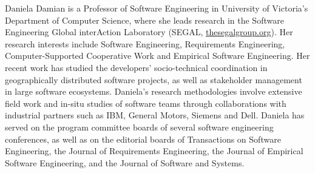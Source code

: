 \documentclass[10pt,journal,compsoc,letterpaper]{IEEEtran}
\begin{document}
\begin{IEEEbiography}{Daniela Damian}
is a Professor of Software Engineering in University of Victoria’s Department of Computer Science, where she leads research in the Software Engineering Global interAction Laboratory (SEGAL, \url{thesegalgroup.org}).
Her research interests include Software Engineering, Requirements Engineering, Computer-Supported Cooperative Work and Empirical Software Engineering. Her recent work has studied the developers’ socio-technical coordination in geographically distributed software projects, as well as stakeholder management in large software ecosystems.
Daniela’s research methodologies involve extensive field work and in-situ studies of software teams through collaborations with industrial partners such as IBM, General Motors, Siemens and Dell.
Daniela has served on the program committee boards of several software engineering conferences, as well as on the editorial boards of Transactions on Software Engineering, the Journal of Requirements Engineering, the Journal of Empirical Software Engineering, and the Journal of Software and Systems.
\end{IEEEbiography}



\vfill




\end{document}

